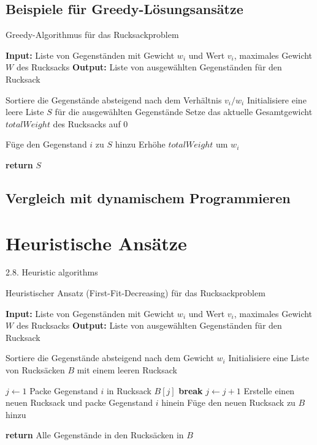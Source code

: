 \documentclass[12pt]{report}
\begin{document}
\section{Beispiele für Greedy-Lösungsansätze}
\begin{algorithm}
	\caption{Greedy-Algorithmus für das Rucksackproblem}
	\begin{algorithmic}[1]
		\State \textbf{Input:} Liste von Gegenständen mit Gewicht $w_i$ und Wert $v_i$, maximales Gewicht $W$ des Rucksacks
		\State \textbf{Output:} Liste von ausgewählten Gegenständen für den Rucksack
		
		\State Sortiere die Gegenstände absteigend nach dem Verhältnis $v_i/w_i$
		\State Initialisiere eine leere Liste $S$ für die ausgewählten Gegenstände
		\State Setze das aktuelle Gesamtgewicht $totalWeight$ des Rucksacks auf $0$
		
		\State Füge den Gegenstand $i$ zu $S$ hinzu
		\State Erhöhe $totalWeight$ um $w_i$
		\EndIf
		\EndFor
		
		\State \textbf{return} $S$
	\end{algorithmic}
\end{algorithm}

\section{Vergleich mit dynamischem Programmieren}

\newpage
\chapter{Heuristische Ansätze}
2.8. Heuristic algorithms \cite{martello1987algorithms}


\begin{algorithm}
	\caption{Heuristischer Ansatz (First-Fit-Decreasing) für das Rucksackproblem}
	\begin{algorithmic}[1]
		\State \textbf{Input:} Liste von Gegenständen mit Gewicht $w_i$ und Wert $v_i$, maximales Gewicht $W$ des Rucksacks
		\State \textbf{Output:} Liste von ausgewählten Gegenständen für den Rucksack
		
		\State Sortiere die Gegenstände absteigend nach dem Gewicht $w_i$
		\State Initialisiere eine Liste von Rucksäcken $B$ mit einem leeren Rucksack
		
		\State $j \gets 1$
		\State Packe Gegenstand $i$ in Rucksack $B[j]$
		\State \textbf{break}
		\EndIf
		\State $j \gets j + 1$
		\EndWhile
		\State Erstelle einen neuen Rucksack und packe Gegenstand $i$ hinein
		\State Füge den neuen Rucksack zu $B$ hinzu
		\EndIf
		\EndFor
		
		\State \textbf{return} Alle Gegenstände in den Rucksäcken in $B$
	\end{algorithmic}
\end{algorithm}
\end{document}
